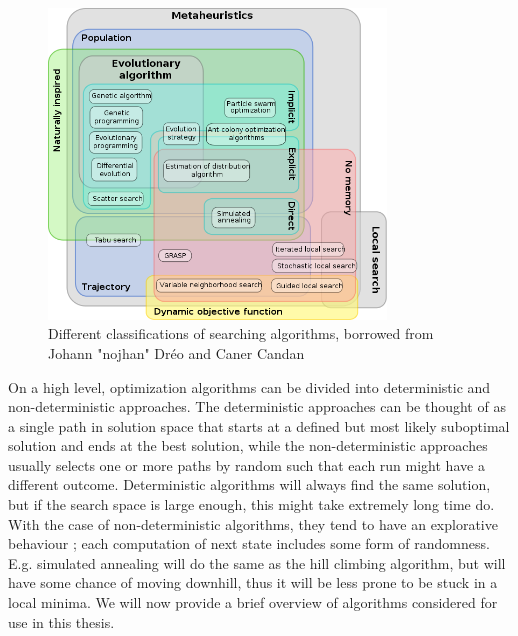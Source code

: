 \begin{figure}
    \centering
    \includegraphics[width=0.8\textwidth]{figs/630px-Metaheuristics_classification.png}
    \caption{Different classifications of searching algorithms, borrowed from Johann "nojhan" Dréo and Caner Candan\cite{wikimetaheuristics}}
    \label{fig:metaheuristics}
\end{figure}

On a high level, optimization algorithms can be divided into deterministic and
non-deterministic approaches. The deterministic approaches can be thought of as
a single path in solution space that starts at a defined but most likely
suboptimal solution and ends at the best solution, while the non-deterministic
approaches usually selects one or more paths by random such that each run might
have a different outcome. Deterministic algorithms will always find the same
solution, but if the search space is large enough, this might take extremely
long time do.  With the case of non-deterministic algorithms, they tend to have
an explorative behaviour \cite{poli2008field}; each computation of next state
includes some form of randomness. E.g. simulated annealing will do the same as
the hill climbing algorithm, but will have some chance of moving downhill, thus
it will be less prone to be stuck in a local minima. We will now provide a brief
overview of algorithms considered for use in this thesis.


